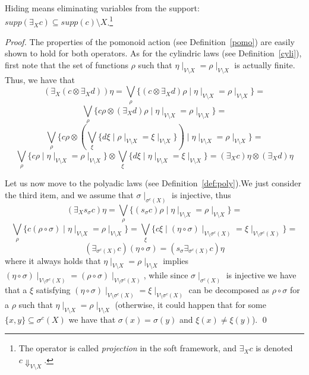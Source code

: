 \documentclass{llncs}
\begin{document}
Hiding means eliminating variables from the support:
$supp(\exists_X c) \subseteq supp({c}) \setminus X$.\footnote{The operator
	is called \emph{projection} in the soft framework,
	and $\exists_X c$ is denoted $c\Downarrow_{V\setminus X}$.}

\begin{proof}
%
The properties of the pomonoid action (see Definition~\ref{pomo})
are easily shown to hold for both operators. 
%
As for the cylindric laws (see Definition~\ref{cyli}), first note that the set of functions 
$\rho$ such that $\eta\mid_{V \setminus X} = \rho\mid_{V \setminus X}$ is actually finite.
Thus, we have that 
\[(\exists_X (c \otimes \exists_X d)) \eta = 
\bigvee_\rho \{(c \otimes \exists_X d) \rho \mid \eta\mid_{V \setminus X} = \rho\mid_{V \setminus X}\} =\]
\[\bigvee_\rho \{c\rho \otimes (\exists_X d) \rho \mid \eta\mid_{V \setminus X} = \rho\mid_{V \setminus X}\} = \]
\[\bigvee_\rho \{c\rho \otimes  (\bigvee_\xi \{d \xi \mid \rho\mid_{V \setminus X} = \xi\mid_{V \setminus X}\}) \mid \eta\mid_{V \setminus X} = \rho\mid_{V \setminus X}\} =\]
\[\bigvee_\rho \{c\rho \mid \eta\mid_{V \setminus X} = \rho\mid_{V \setminus X}\} \otimes
\bigvee_\xi \{d \xi \mid \eta\mid_{V \setminus X} = \xi\mid_{V \setminus X}\} =
(\exists_X c) \eta \otimes (\exists_X d) \eta \]

Let us now move to the polyadic laws (see Definition~\ref{def:poly}).We just consider the third item, 
and we assume that $\sigma \mid_{\sigma^c(X)}$ is injective, thus
\[(\exists_X s_\sigma c) \eta = \bigvee_\rho \{(s_\sigma c) \rho \mid \eta\mid_{V \setminus X} = \rho\mid_{V \setminus X}\} =\]
\[\bigvee_\rho \{c (\rho \circ \sigma) \mid \eta\mid_{V \setminus X} = \rho\mid_{V \setminus X}\} = 
\bigvee_\xi \{c\xi \mid (\eta \circ \sigma)\mid_{V \setminus \sigma^{c}(X)} = \xi\mid_{V \setminus \sigma^{c}(X)}\} =\]
\[(\exists_{\sigma^c(X)} c) (\eta \circ \sigma) = (s_\sigma \exists_{\sigma^c(X)} c) \eta\]
\noindent
where it always holds that $\eta\mid_{V \setminus X} = \rho\mid_{V \setminus X}$ implies $(\eta\circ \sigma)\mid_{V \setminus \sigma^{c}(X)} = (\rho\circ \sigma)\mid_{V \setminus \sigma^{c}(X)}$,
while since $\sigma \mid_{\sigma^c(X)}$ is injective we have that
a $\xi$ satisfying $(\eta \circ \sigma)\mid_{V \setminus \sigma^{c}(X)} = \xi\mid_{V \setminus \sigma^{c}(X)}$ can be decomposed as $\rho\circ \sigma$
for a $\rho$ such that $\eta\mid_{V \setminus X} = \rho\mid_{V \setminus X}$
(otherwise, it could happen that for some $\{x, y\} \subseteq \sigma^c(X)$ we have that $\sigma(x) =\sigma(y)$ and 
$\xi(x) \neq \xi(y)$).
\qed
\end{proof}
\end{document}

